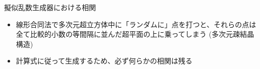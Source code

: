 \begin{frame}[t,fragile]{擬似乱数生成器における相関}
  \begin{itemize}
  \item 線形合同法で多次元超立方体中に「ランダムに」点を打つと、それらの点は全て比較的小数の等間隔に並んだ超平面の上に乗ってしまう (多次元疎結晶構造)

    
  \item 計算式に従って生成するため、必ず何らかの相関は残る
  \end{itemize}
\end{frame}
